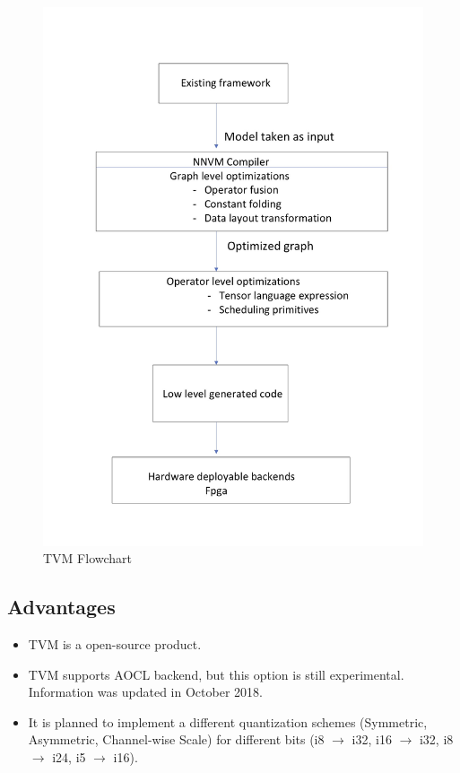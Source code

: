 \documentclass[titlepage]{report}
\begin{document}
\begin{figure}[h!]
    \centering
    \includegraphics[scale=0.19]{TVM_Flowchart.jpg}
    \caption{TVM Flowchart}
\end{figure}
 
 \subsection{Advantages}
 \begin{itemize}
 \item TVM is a open-source product.
 \item TVM supports AOCL backend, but this option is still experimental. Information was updated in October 2018.
  \item It is planned to implement a different quantization schemes (Symmetric, Asymmetric, Channel-wise Scale) for different bits (i8 $\to$ i32, i16 $\to$ i32, i8 $\to$ i24, i5 $\to$ i16).
 \end{itemize}
\end{document}
